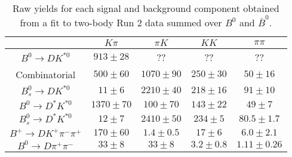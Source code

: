 \begin{table}
  \centering
  \begin{tabular}{ccccc}
      \toprule
       & $K\pi$ & $\pi K$ & $KK$ & $\pi\pi$ \\
      \midrule
      $B^0 \to DK^{*0}$ & $913 \pm 28$ & ?? & ?? & ?? \\
      Combinatorial & $500 \pm 60$ & $1070 \pm 90$ & $250 \pm 30$ & $50 \pm 16$ \\
      $B^0_s \to DK^{*0}$ & $11 \pm 6$ & $2210 \pm 40$ & $218 \pm 16$ & $91 \pm 10$ \\
      $B^0 \to D^*K^{*0}$ & $1370 \pm 70$ & $100 \pm 70$ & $143 \pm 22$ & $49 \pm 7$ \\
      $B^0_s \to D^*K^{*0}$ & $12 \pm 7$ & $2410 \pm 50$ & $234 \pm 5$ & $80.5 \pm 1.7$ \\
      $B^+ \to DK^+\pi^-\pi^+$ & $170 \pm 60$ & $1.4 \pm 0.5$ & $17 \pm 6$ & $6.0 \pm 2.1$ \\
      $B^0 \to D\pi^+\pi^-$ & $33 \pm 8$ & $33 \pm 8$ & $3.2 \pm 0.8$ & $1.11 \pm 0.26$ \\
      \bottomrule
      \end{tabular}
  \caption{Raw yields for each signal and background component obtained from a fit to two-body Run 2 data summed over $B^0$ and $\bar{B}^0$.}
\label{tab:yields_combined_2body_run2}
\end{table}
